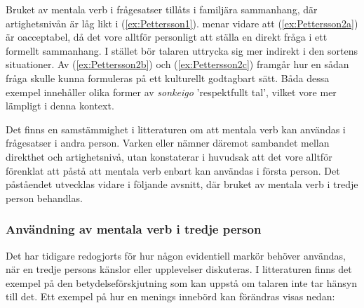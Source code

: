 \documentclass[12pt,a4paper]{article}
\begin{document}
\begin{exe}
\ex
\begin{xlist}
\end{xlist}
\end{exe}

Bruket av mentala verb i frågesatser tillåts i familjära sammanhang, där artighetsnivån är låg likt i (\ref{ex:Pettersson1}). \textcite{pettersson1995} menar vidare att (\ref{ex:Pettersson2a}) är oacceptabel, då det vore alltför personligt att ställa en direkt fråga i ett formellt sammanhang. I stället bör talaren uttrycka sig mer indirekt i den sortens situationer. Av (\ref{ex:Pettersson2b}) och (\ref{ex:Pettersson2c}) framgår hur en sådan fråga skulle kunna formuleras på ett kulturellt godtagbart sätt. Båda dessa exempel innehåller olika former av \emph{sonkeigo} 'respektfullt tal', vilket vore mer lämpligt i denna kontext.

Det finns en samstämmighet i litteraturen om att mentala verb kan användas i frågesatser i andra person. Varken \textcite{kuno1973} eller \textcite{makino1986} nämner däremot sambandet mellan direkthet och artighetsnivå, utan konstaterar i huvudsak att det vore alltför förenklat att påstå att mentala verb enbart kan användas i första person. Det påståendet utvecklas vidare i följande avsnitt, där bruket av mentala verb i tredje person behandlas.

\subsubsection{Användning av mentala verb i tredje person}
\label{subsec:Bakgrund: Mentala verb: Användning av mentala verb i tredje person}
Det har tidigare redogjorts för hur någon evidentiell markör behöver användas, när en tredje persons känslor eller upplevelser diskuteras. I litteraturen finns det exempel på den betydelseförskjutning som kan uppstå om talaren inte tar hänsyn till det. Ett exempel på hur en menings innebörd kan förändras visas nedan:
\end{document}
